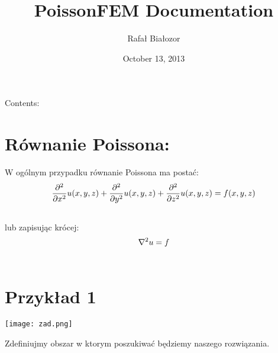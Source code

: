 \documentclass[letterpaper,10pt,english]{sphinxmanual}
\title{PoissonFEM Documentation}
\date{October 13, 2013}
\author{Rafał Białozor}
\begin{document}
\maketitle
\tableofcontents
{}\label{index::doc}


Contents:


\chapter{Równanie Poissona:}
\label{index:rownanie-poissona}\label{index:rozwiazanie-rownania-poissona-metoda-elementow-skonczonych}
W ogólnym przypadku równanie Poissona ma postać:
\begin{gather}
\begin{split}\frac{\partial ^{2}}{\partial x^{2}} u(x,y,z)+
\frac{\partial ^{2}}{\partial y^{2}} u(x,y,z)+
\frac{\partial ^{2}}{\partial z^{2}} u(x,y,z) = f(x,y,z)\end{split}\notag\\\begin{split}\end{split}\notag
\end{gather}
lub zapisując krócej:
\begin{gather}
\begin{split}\nabla ^{2} u = f\end{split}\notag\\\begin{split}\end{split}\notag
\end{gather}

\chapter{Przykład 1}
\label{index:przyklad-1}
\texttt{[image: zad.png]}

Zdefiniujmy obszar w ktorym poszukiwać będziemy naszego rozwiązania.
\end{document}
